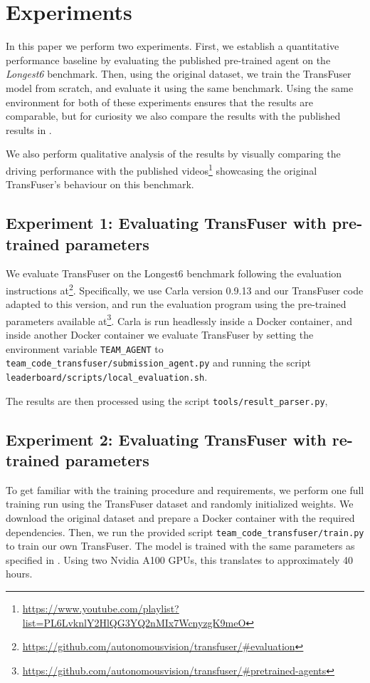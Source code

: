 \section{Experiments}

In this paper we perform two experiments.
First, we establish a quantitative performance baseline 
by evaluating the published pre-trained agent on the \textit{Longest6} benchmark.
Then, using the original dataset, we train the TransFuser model from scratch,
and evaluate it using the same benchmark.
Using the same environment for both of these experiments ensures that the results are comparable,
but for curiosity we also compare the results with the published results in \cite{transfuser-pami}.

We also perform qualitative analysis of the results by visually comparing the driving performance
with the published videos\footnote{\url{https://www.youtube.com/playlist?list=PL6LvknlY2HlQG3YQ2nMIx7WcnyzgK9meO}}
showcasing the original TransFuser's behaviour on this benchmark.


\subsection{Experiment 1: Evaluating TransFuser with pre-trained parameters}
\label{sec:method:experiment1}

We evaluate TransFuser on the Longest6 benchmark following the evaluation instructions at\footnote{
\url{https://github.com/autonomousvision/transfuser/\#evaluation}}.
Specifically,
we use Carla version 0.9.13 and our TransFuser code adapted to this version,
and run the evaluation program using the pre-trained parameters available at\footnote{
\url{https://github.com/autonomousvision/transfuser/\#pretrained-agents}}.
Carla is run headlessly inside a Docker container,
and inside another Docker container we evaluate TransFuser
by setting the environment variable \texttt{TEAM\_AGENT} to \texttt{team\_code\_transfuser/submission\_agent.py}
and running the script \texttt{leaderboard/scripts/local\_evaluation.sh}.

The results are then processed using the script \texttt{tools/result\_parser.py},


\subsection{Experiment 2: Evaluating TransFuser with re-trained parameters}

To get familiar with the training procedure and requirements,
we perform one full training run using the TransFuser dataset and randomly initialized weights.
We download the original dataset and prepare a Docker container with the required dependencies.
Then, we run the provided script \texttt{team\_code\_transfuser/train.py} to train our own TransFuser.
The model is trained with the same parameters as specified in \cite{transfuser-pami}.
Using two Nvidia A100 GPUs, this translates to approximately 40 hours.

